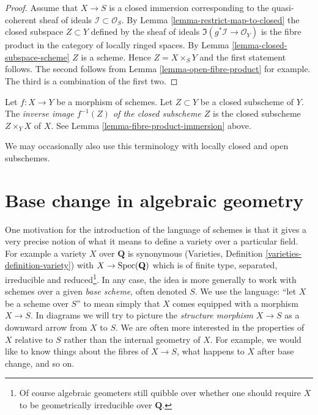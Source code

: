 \begin{proof}
Assume that $X \to S$ is a closed immersion corresponding
to the quasi-coherent sheaf of ideals $\mathcal{I} \subset \mathcal{O}_S$.
By Lemma \ref{lemma-restrict-map-to-closed} the closed subspace
$Z \subset Y$ defined by the sheaf of ideals
$\Im(g^*\mathcal{I} \to \mathcal{O}_Y)$ is the fibre product
in the category of locally ringed spaces.
By Lemma \ref{lemma-closed-subspace-scheme} $Z$ is a scheme.
Hence $Z = X \times_S Y$ and the first statement follows.
The second follows from Lemma \ref{lemma-open-fibre-product}
for example. The third is a combination of
the first two.
\end{proof}

\begin{definition}
\label{definition-inverse-image-closed-subscheme}
Let $f : X \to Y$ be a morphism of schemes. Let $Z \subset Y$ be a
closed subscheme of $Y$. The {\it inverse image $f^{-1}(Z)$ of the
closed subscheme $Z$} is the closed subscheme $Z \times_Y X$ of
$X$. See Lemma \ref{lemma-fibre-product-immersion} above.
\end{definition}

\noindent
We may occasionally also use this terminology with locally closed and
open subschemes.









\section{Base change in algebraic geometry}
\label{section-base-change}

\noindent
One motivation for the introduction of the language of schemes
is that it gives a very precise notion of what it means to
define a variety over a particular field. For example a variety
$X$ over $\mathbf{Q}$ is synonymous
(Varieties, Definition \ref{varieties-definition-variety})
with $X \to \mathop{\mathrm{Spec}}(\mathbf{Q})$ which is of finite type,
separated, irreducible and reduced\footnote{Of course algebraic
geometers still quibble over whether one should require $X$ to be
geometrically irreducible over $\mathbf{Q}$.}. In any case, the idea
is more generally to work with schemes over a given {\it base scheme},
often denoted $S$. We use the language: ``let $X$ be a scheme over $S$''
to mean simply that $X$ comes equipped with a morphism $X \to S$.
In diagrams we will try to picture the {\it structure morphism}
$X \to S$ as a downward arrow from $X$ to $S$.
We are often more interested in the properties of $X$ relative
to $S$ rather than the internal geometry of $X$.
For example, we would like to know things about the fibres of $X \to S$,
what happens to $X$ after base change, and so on.


